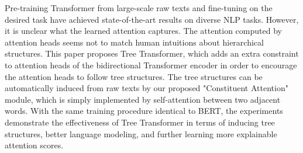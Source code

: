 Pre-training Transformer from large-scale raw texts and fine-tuning on the desired task have achieved state-of-the-art results on diverse NLP tasks. However, it is unclear what the learned attention captures. The attention computed by attention heads seems not to match human intuitions about hierarchical structures. This paper proposes Tree Transformer, which adds an extra constraint to attention heads of the bidirectional Transformer encoder in order to encourage the attention heads to follow tree structures. The tree structures can be automatically induced from raw texts by our proposed "Constituent Attention" module, which is simply implemented by self-attention between two adjacent words. With the same training procedure identical to BERT, the experiments demonstrate the effectiveness of Tree Transformer in terms of inducing tree structures, better language modeling, and further learning more explainable attention scores.